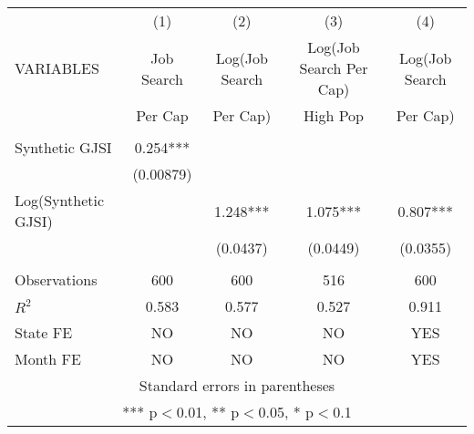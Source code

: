 \begin{center}
\begin{tabular}{lcccc} \hline
 & (1) & (2) & (3) & (4) \\
VARIABLES & Job Search  & Log(Job Search & Log(Job Search Per Cap) & Log(Job Search  \\
          & Per Cap     &   Per Cap)     & High Pop             & Per Cap) \\ \hline
\vspace{4pt} &  &  &  &  \\
Synthetic GJSI & 0.254*** &  &  &  \\
\vspace{4pt} & (0.00879) &  &  &  \\
Log(Synthetic GJSI) &  & 1.248*** & 1.075*** & 0.807*** \\
 &  & (0.0437) & (0.0449) & (0.0355) \\
\vspace{4pt} &  &  &  &  \\
Observations & 600 & 600 & 516 & 600 \\
$R^2$ & 0.583 & 0.577 & 0.527 & 0.911 \\
State FE & NO & NO & NO & YES \\
 Month FE & NO & NO & NO & YES \\ \hline
\multicolumn{5}{c}{ Standard errors in parentheses} \\
\multicolumn{5}{c}{ *** p$<$0.01, ** p$<$0.05, * p$<$0.1} \\
\end{tabular}
\end{center}
